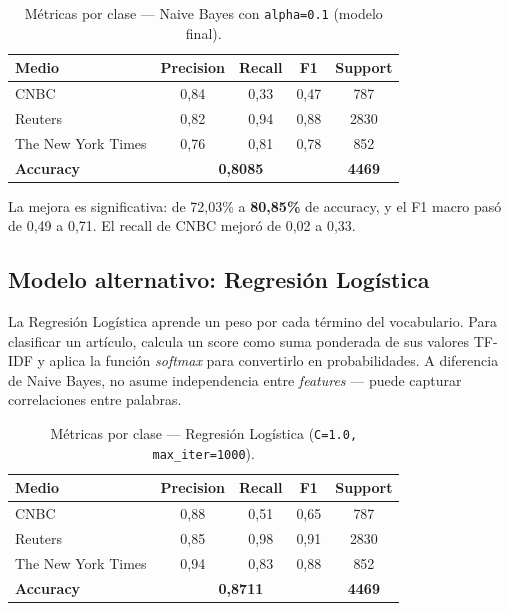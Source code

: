\documentclass[12pt,a4paper]{article}
\begin{document}
\begin{table}[H]
  \centering
  \begin{tabular}{lcccc}
    \toprule
    \textbf{Medio} & \textbf{Precision} & \textbf{Recall} & \textbf{F1} & \textbf{Support} \\
    \midrule
    CNBC              & 0,84 & 0,33 & 0,47 & 787  \\
    Reuters           & 0,82 & 0,94 & 0,88 & 2830 \\
    The New York Times & 0,76 & 0,81 & 0,78 & 852  \\
    \midrule
    \textbf{Accuracy} & \multicolumn{3}{c}{\textbf{0,8085}} & \textbf{4469} \\
    \bottomrule
  \end{tabular}
  \caption{Métricas por clase --- Naive Bayes con \texttt{alpha=0.1} (modelo final).}
\end{table}

La mejora es significativa: de 72,03\% a \textbf{80,85\%} de accuracy, y el F1 macro pasó de 0,49 a 0,71. El recall de CNBC mejoró de 0,02 a 0,33.

\subsection{Modelo alternativo: Regresión Logística}

La Regresión Logística aprende un peso por cada término del vocabulario. Para clasificar un artículo, calcula un score como suma ponderada de sus valores TF-IDF y aplica la función \textit{softmax} para convertirlo en probabilidades. A diferencia de Naive Bayes, no asume independencia entre \textit{features} --- puede capturar correlaciones entre palabras.

\begin{table}[H]
  \centering
  \begin{tabular}{lcccc}
    \toprule
    \textbf{Medio} & \textbf{Precision} & \textbf{Recall} & \textbf{F1} & \textbf{Support} \\
    \midrule
    CNBC              & 0,88 & 0,51 & 0,65 & 787  \\
    Reuters           & 0,85 & 0,98 & 0,91 & 2830 \\
    The New York Times & 0,94 & 0,83 & 0,88 & 852  \\
    \midrule
    \textbf{Accuracy} & \multicolumn{3}{c}{\textbf{0,8711}} & \textbf{4469} \\
    \bottomrule
  \end{tabular}
  \caption{Métricas por clase --- Regresión Logística (\texttt{C=1.0, max\_iter=1000}).}
\end{table}
\end{document}
